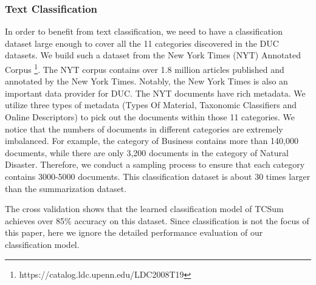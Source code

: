 \documentclass[letterpaper]{article}
\begin{document}
\subsubsection{Text Classification}
In order to benefit from text classification, we need to have a classification dataset large enough to cover all the 11 categories discovered in the DUC datasets.
We build such a dataset from the New York Times (NYT) Annotated Corpus \footnote{https://catalog.ldc.upenn.edu/LDC2008T19}.
The NYT corpus contains over 1.8 million articles published and annotated by the New York Times.
Notably, the New York Times is also an important data provider for DUC.
The NYT documents have rich metadata.
We utilize three types of metadata (Types Of Material, Taxonomic Classifiers and Online Descriptors) to pick out the documents within those 11 categories.
We notice that the numbers of documents in different categories are extremely imbalanced.
For example, the category of Business contains more than 140,000 documents, while there are only 3,200 documents in the category of Natural Disaster.
Therefore, we conduct a sampling process to ensure that each category contains 3000-5000 documents.
This classification dataset is about 30 times larger than the summarization dataset.

The cross validation shows that the learned classification model of TCSum achieves over 85\% accuracy on this dataset.
Since classification is not the focus of this paper, here we ignore the detailed performance evaluation of our classification model.

\end{document}
